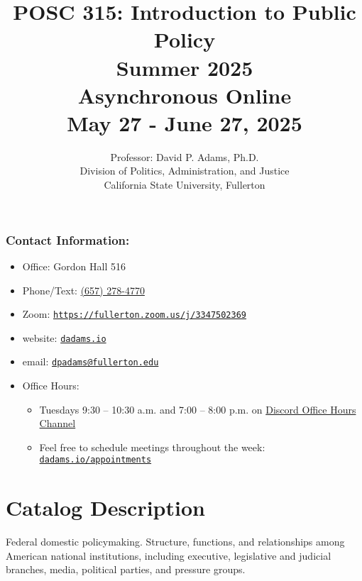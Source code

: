 \documentclass[11pt, letterpaper]{article}
\begin{document}
\title{POSC 315: Introduction to Public Policy \\ Summer 2025 \\ \smallskip \small Asynchronous Online \\ May 27 - June 27, 2025}
\author{Professor: David P. Adams, Ph.D. \\ \smallskip \small Division of Politics, Administration, and Justice \\ California State University, Fullerton}
\date{}
    \maketitle

\subsubsection*{Contact Information:}

\begin{itemize}
    \item Office: Gordon Hall 516
    \item Phone/Text: \href{tel:+16572784770}{(657) 278-4770}
    \item Zoom: \href{https://fullerton.zoom.us/j/3347502369}{\texttt{https://fullerton.zoom.us/j/3347502369}}
    \item website: \href{https://dadams.io}{\texttt{dadams.io}}
    \item email: \href{mailto:dpadams@fullerton.edu}{\texttt{dpadams@fullerton.edu}}
    \item Office Hours:
        \begin{itemize}
            \item Tuesdays 9:30 -- 10:30 a.m. and 7:00 -- 8:00 p.m. on \href{https://discord.com/channels/1128747433636135113/1154048074172354600}{Discord Office Hours Channel}
            \item Feel free to schedule meetings throughout the week: \href{https://dadams.io/appointments}{\texttt{dadams.io/appointments}}
        \end{itemize}  
\end{itemize}


\section{Catalog Description}

	Federal domestic policymaking. Structure, functions, and relationships among American national institutions, including executive, legislative and judicial branches, media, political parties, and pressure groups.
\end{document}
